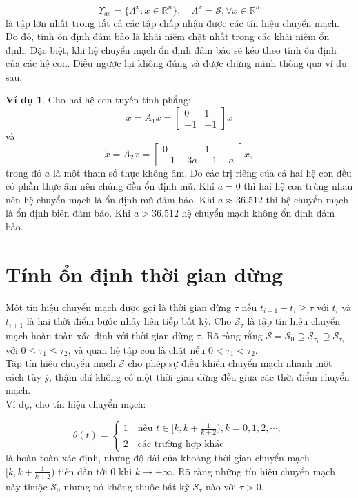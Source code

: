 \documentclass[14pt,a4paper,oneside]{report}		%
\theoremstyle{definition}
\newtheorem{example}[theorem]{Ví dụ}
\begin{document}
$$\Upsilon_{as}=\{\Lambda^x:x\in\mathbb{R}^n\},\quad \Lambda^x=\mathcal{S},\forall x\in\mathbb{R}^n$$
là tập lớn nhất trong tất cả các tập chấp nhận được các tín hiệu chuyển mạch. Do đó, tính ổn định đảm bảo là khái niệm chặt nhất trong các khái niệm ổn định. Đặc biệt, khi hệ chuyển mạch ổn định đảm bảo sẽ kéo theo tính ổn định của các hệ con. Điều ngược lại không đúng và được chứng minh thông qua ví dụ sau.\\
\begin{example}
Cho hai hệ con tuyến tính phẳng:
$$\dot{x}=A_1x=
\begin{bmatrix}
0 & 1\\
-1 & -1
\end{bmatrix}x$$
và
$$\dot{x}=A_2x=
\begin{bmatrix}
0 & 1\\
-1-3a & -1-a
\end{bmatrix}x,$$
trong đó $a$ là một tham số thực không âm. Do các trị riêng của cả hai hệ con đều có phần thực âm nên chúng đều ổn định mũ. Khi $a=0$ thì hai hệ con trùng nhau nên hệ chuyển mạch là ổn định mũ đảm bảo. Khi $a\approx 36.512$ thì hệ chuyển mạch là ổn định biên đảm bảo. Khi $a>36.512$ hệ chuyển mạch không ổn định đảm bảo.
\end{example}

\section{Tính ổn định thời gian dừng}
Một tín hiệu chuyển mạch được gọi là thời gian dừng $\tau$ nếu $t_{i+1}-t_i\geq\tau$ với $t_i$ và $t_{i+1}$ là hai thời điểm bước nhảy liên tiếp bất kỳ. Cho $\mathcal{S}_\tau$ là tập tín hiệu chuyển mạch hoàn toàn xác định với thời gian dừng $\tau$. Rõ ràng rằng $\mathcal{S}=\mathcal{S}_0\supseteq\mathcal{S}_{\tau_1}\supseteq\mathcal{S}_{\tau_2}$ với $0\leq\tau_1\leq\tau_2$, và quan hệ tập con là chặt nếu $0<\tau_1<\tau_2$.\\

Tập tín hiệu chuyển mạch $\mathcal{S}$ cho phép sự điều khiển chuyển mạch nhanh một cách tùy ý, thậm chí không có một thời gian dừng đều giữa các thời điểm chuyển mạch.\\

Ví dụ, cho tín hiệu chuyển mạch:

$$\theta(t)=\begin{cases}
1\quad\text{nếu } t\in[k,k+\frac{1}{k+2}), k=0,1,2,\cdots,\\
2\quad\text{các trường hợp khác}
\end{cases}$$
là hoàn toàn xác định, nhưng độ dài của khoảng thời gian chuyển mạch $[k,k+\frac{1}{k+2})$ tiến dần tới $0$ khi $k\rightarrow +\infty$. Rõ ràng những tín hiệu chuyển mạch này thuộc $\mathcal{S}_0$ nhưng nó không thuộc bất kỳ $\mathcal{S}_\tau$ nào với $\tau>0$.\\
\end{document}
